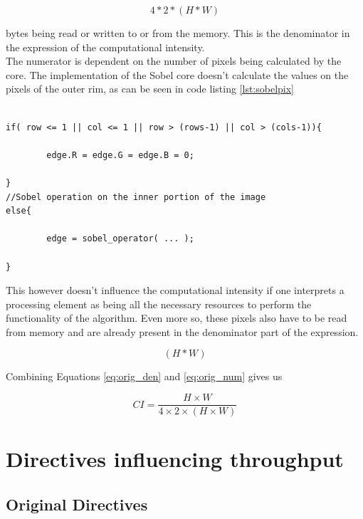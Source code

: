 \begin{equation} \label{eq:orig_den}
4 * 2 * ( H * W )
\end{equation}

bytes being read or written to or from the memory. This is the denominator in the expression of the computational intensity.\\
The numerator is dependent on the number of pixels being calculated by the core. The implementation of the Sobel core doesn't calculate the values on the pixels of the outer rim, as can be seen in code listing \ref{lst:sobelpix}

\begin{lstlisting}[caption=Sobel Code Snippet, captionpos=b, label=lst:sobelpix]

if( row <= 1 || col <= 1 || row > (rows-1) || col > (cols-1)){
		
		edge.R = edge.G = edge.B = 0;
		
}
//Sobel operation on the inner portion of the image
else{

		edge = sobel_operator( ... );
		
}

\end{lstlisting}

This however doesn't influence the computational intensity if one interprets a processing element as being all the necessary resources to perform the functionality of the algorithm. Even more so, these pixels also have to be read from memory and are already present in the denominator part of the expression.


\begin{equation} \label{eq:orig_num}
( H * W )
\end{equation}

\medskip
Combining Equations \ref{eq:orig_den} and \ref{eq:orig_num} gives us
\medskip

\begin{equation}
CI = \frac{H \times W}{4 \times 2 \times ( H \times W )}
\end{equation}




\section{Directives influencing throughput}

\subsection{Original Directives}
\label{sec:original_pragma}

